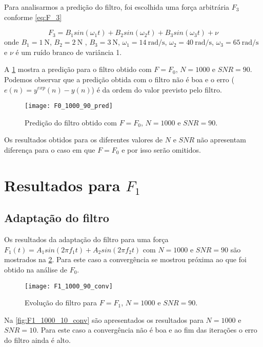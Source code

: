 Para analisarmos a predição do filtro, foi escolhida uma força arbitrária $ F_3 $ conforme \cref{eq:F_3}

\begin{equation}\label{eq:F_3}
F_3 = B_1 sin(\omega_1 t)
+ B_2 sin(\omega_2 t)
+ B_3 sin(\omega_3 t)
+ \nu
\end{equation}
onde $ B_1=\SI{1}{\N} $, $ B_2=\SI{2}{\N}$ , $ B_3=\SI{3}{\N} $, $ \omega_1= \SI{14}{\radian \per \s} $, $ \omega_2= \SI{40}{\radian \per \s} $, $ \omega_3= \SI{65}{\radian \per \s} $ e $ \nu $ é um ruído branco de variância 1.

A \cref{fig:F0_1000_90_pred} mostra a predição para o filtro obtido com $ F=F_0 $, $ N=1000 $ e $ SNR=90 $. Podemos observar que a predição obtida com o filtro não é boa e o erro ($ e(n)=y^{exp}(n) - y(n) $) é da ordem do valor previsto pelo filtro.

\begin{figure}[h]
	\centering
	\texttt{[image: F0\_1000\_90\_pred]}
	\caption{Predição do filtro obtido com $ F=F_0 $, $ N=1000 $ e $ SNR=90 $.}
	\label{fig:F0_1000_90_pred}
\end{figure}

Os resultados obtidos para os diferentes valores de $ N $ e $ SNR $ não apresentam diferença para o caso em que $ F=F_0 $ e por isso serão omitidos.

\section{Resultados para $ F_1 $}
\subsection{Adaptação do filtro}\label{adapt_F_1}

Os resultados da adaptação do filtro para uma força $F_1(t) = A_1 sin(2\pi f_1 t) + A_2 sin(2\pi f_2 t)$  com $ N=1000 $  e $ SNR = 90 $ são mostrados na \cref{fig:F1_1000_90_conv}. Para este caso a convergência se mostrou próxima ao que foi obtido na análise de $ F_0 $. 

\begin{figure}
	\centering
	\texttt{[image: F1\_1000\_90\_conv]}
	\caption{Evolução do filtro para $ F=F_1 $, $ N=1000 $ e $ SNR=90 $.}
	\label{fig:F1_1000_90_conv}
\end{figure}

Na \cref{fig:F1_1000_10_conv} são apresentados os resultados para $ N=1000 $ e $ SNR=10 $. Para este caso a convergência não é boa e ao fim das iterações o erro do filtro ainda é alto. 

